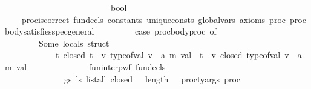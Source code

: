 \begin{isabellebody}
\ \ \ \ \ \ \ \ \ \ \ \ \ \ \ \ \ \ \ \ \ \ \ \ \ bool{\isachardoublequoteclose}\isanewline
\ \ \ \isanewline
\ \ \ \ {\isachardoublequoteopen}proc{\isacharunderscore}{\kern0pt}is{\isacharunderscore}{\kern0pt}correct\ fun{\isacharunderscore}{\kern0pt}decls\ constants\ unique{\isacharunderscore}{\kern0pt}consts\ global{\isacharunderscore}{\kern0pt}vars\ axioms\ proc\ proc{\isacharunderscore}{\kern0pt}body{\isacharunderscore}{\kern0pt}satisfies{\isacharunderscore}{\kern0pt}spec{\isacharunderscore}{\kern0pt}general\ {\isacharequal}{\kern0pt}\ \ \isanewline
\ \ \ \ \ \ {\isacharparenleft}{\kern0pt}case\ proc{\isacharunderscore}{\kern0pt}body{\isacharparenleft}{\kern0pt}proc{\isacharparenright}{\kern0pt}\ of\isanewline
\ \ \ \ \ \ \ \ Some\ {\isacharparenleft}{\kern0pt}locals{\isacharcomma}{\kern0pt}\ struct{\isacharparenright}{\kern0pt}\ {\isasymRightarrow}\ \isanewline
\ \ \ \ \ \ \ \ \ \ {\isacharparenleft}{\kern0pt}\ {\isacharparenleft}{\kern0pt}\ {\isacharparenleft}{\kern0pt}{\isasymforall}t{\isachardot}{\kern0pt}\ closed\ t\ {\isasymlongrightarrow}\ {\isacharparenleft}{\kern0pt}{\isasymexists}v{\isachardot}{\kern0pt}\ type{\isacharunderscore}{\kern0pt}of{\isacharunderscore}{\kern0pt}val\ {\isacharparenleft}{\kern0pt}v\ {\isacharcolon}{\kern0pt}{\isacharcolon}{\kern0pt}\ {\isacharparenleft}{\kern0pt}{\isacharprime}{\kern0pt}a{\isacharcomma}{\kern0pt}\ {\isacharprime}{\kern0pt}m{\isacharparenright}{\kern0pt}\ val{\isacharparenright}{\kern0pt}\ {\isacharequal}{\kern0pt}\ t{\isacharparenright}{\kern0pt}{\isacharparenright}{\kern0pt}\ {\isasymand}\ {\isacharparenleft}{\kern0pt}{\isasymforall}v{\isachardot}{\kern0pt}\ closed\ {\isacharparenleft}{\kern0pt}type{\isacharunderscore}{\kern0pt}of{\isacharunderscore}{\kern0pt}val\ {\isacharparenleft}{\kern0pt}v\ {\isacharcolon}{\kern0pt}{\isacharcolon}{\kern0pt}\ {\isacharparenleft}{\kern0pt}{\isacharprime}{\kern0pt}a{\isacharcomma}{\kern0pt}\ {\isacharprime}{\kern0pt}m{\isacharparenright}{\kern0pt}\ val{\isacharparenright}{\kern0pt}{\isacharparenright}{\kern0pt}{\isacharparenright}{\kern0pt}\ {\isacharparenright}{\kern0pt}\ {\isasymlongrightarrow}\isanewline
\ \ \ \ \ \ \ \ \ \ {\isacharparenleft}{\kern0pt}{\isasymforall}\ {\isasymGamma}{\isachardot}{\kern0pt}\ fun{\isacharunderscore}{\kern0pt}interp{\isacharunderscore}{\kern0pt}wf\ fun{\isacharunderscore}{\kern0pt}decls\ {\isasymGamma}\ {\isasymlongrightarrow}\isanewline
\ \ \ \ \ \ \ \ \ \ {\isacharparenleft}{\kern0pt}\isanewline
\ \ \ \ \ \ \ \ \ \ \ \ \ {\isacharparenleft}{\kern0pt}{\isasymforall}{\isasymOmega}\ gs\ ls{\isachardot}{\kern0pt}\ {\isacharparenleft}{\kern0pt}list{\isacharunderscore}{\kern0pt}all\ closed\ {\isasymOmega}\ {\isasymand}\ length\ {\isasymOmega}\ {\isacharequal}{\kern0pt}\ proc{\isacharunderscore}{\kern0pt}ty{\isacharunderscore}{\kern0pt}args\ proc{\isacharparenright}{\kern0pt}\ {\isasymlongrightarrow}\ \ \ \ \ \ \ \ \isanewline

\end{isabellebody}
